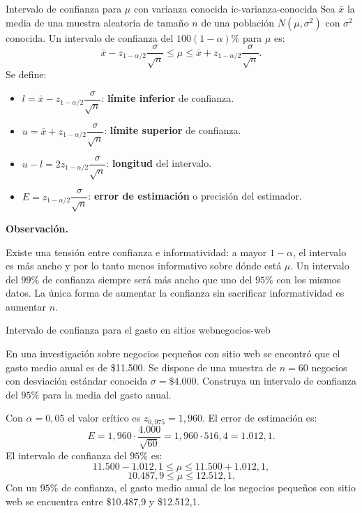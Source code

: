 \documentclass[12pt, a4paper]{book}
\newenvironment{observacion}{%
    \par\medskip\noindent\textbf{\color{azul}Observaci\'{o}n.}\enspace\itshape
}{\par\medskip}
\numberwithin{equation}{chapter}
\begin{document}
\begin{definicion}{Intervalo de confianza
		para $\mu$ con varianza conocida}
	{ic-varianza-conocida}
	Sea $\bar{x}$ la media de una muestra
	aleatoria de tama\~{n}o $n$ de una
	poblaci\'{o}n $N(\mu, \sigma^2)$ con
	$\sigma^2$ conocida. Un intervalo de
	confianza del $100(1-\alpha)\%$ para
	$\mu$ es:
	\[
	\bar{x} - z_{1-\alpha/2}
	\frac{\sigma}{\sqrt{n}}
	\leq \mu \leq
	\bar{x} + z_{1-\alpha/2}
	\frac{\sigma}{\sqrt{n}}.
	\]
	Se define:
	\begin{itemize}[leftmargin=2em]
		\item $l = \bar{x} - z_{1-\alpha/2}
		\dfrac{\sigma}{\sqrt{n}}$:
		\textbf{l\'{i}mite inferior} de
		confianza.
		\item $u = \bar{x} + z_{1-\alpha/2}
		\dfrac{\sigma}{\sqrt{n}}$:
		\textbf{l\'{i}mite superior} de
		confianza.
		\item $u - l = 2z_{1-\alpha/2}
		\dfrac{\sigma}{\sqrt{n}}$:
		\textbf{longitud} del intervalo.
		\item $E = z_{1-\alpha/2}
		\dfrac{\sigma}{\sqrt{n}}$:
		\textbf{error de estimaci\'{o}n}
		o precisi\'{o}n del estimador.
	\end{itemize}
\end{definicion}

\begin{observacion}
	Existe una tensi\'{o}n entre confianza
	e informatividad: a mayor $1-\alpha$,
	el intervalo es m\'{a}s ancho y por
	lo tanto menos informativo sobre
	d\'{o}nde est\'{a} $\mu$. Un intervalo
	del $99\%$ de confianza siempre
	ser\'{a} m\'{a}s ancho que uno del
	$95\%$ con los mismos datos. La
	\'{u}nica forma de aumentar la
	confianza sin sacrificar informatividad
	es aumentar $n$.
\end{observacion}

\begin{ejemplo}{Intervalo de confianza para
		el gasto en sitios web}{negocios-web}
	
	En una investigaci\'{o}n sobre negocios
	peque\~{n}os con sitio web se encontr\'{o}
	que el gasto medio anual es de
	\$11.500. Se dispone de una muestra de
	$n = 60$ negocios con desviaci\'{o}n
	est\'{a}ndar conocida $\sigma = \$4.000$.
	Construya un intervalo de confianza del
	$95\%$ para la media del gasto anual.
	
	\medskip
	Con $\alpha = 0{,}05$ el valor cr\'{i}tico
	es $z_{0{,}975} = 1{,}960$. El error de
	estimaci\'{o}n es:
	\[
	E = 1{,}960 \cdot
	\frac{4.000}{\sqrt{60}}
	= 1{,}960 \cdot 516{,}4
	= 1.012{,}1.
	\]
	El intervalo de confianza del $95\%$ es:
	\[
	11.500 - 1.012{,}1
	\leq \mu \leq
	11.500 + 1.012{,}1,
	\]
	\[
	10.487{,}9 \leq \mu \leq 12.512{,}1.
	\]
	Con un $95\%$ de confianza, el gasto medio
	anual de los negocios peque\~{n}os con
	sitio web se encuentra entre \$10.487{,}9
	y \$12.512{,}1.
	
\end{ejemplo}
\end{document}
